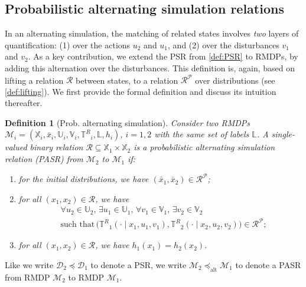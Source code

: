 \documentclass[letterpaper, 10 pt, conference]{ieeeconf}  %
\newtheorem{definition}{Definition}
\newcommand*{\States}{\ensuremath{\mathbb{X}}}
\newcommand*{\Actions}{\ensuremath{\mathbb{U}}}
\newcommand*{\Disturb}{\ensuremath{\mathbb{V}}}
\newcommand*{\Labels}{\ensuremath{\mathbb{L}}}
\newcommand*{\initState}{\ensuremath{\bar{x}}}
\newcommand*{\transfuncR}{\ensuremath{\mathbb{T}^R}}
\newcommand*{\labelfunc}{\ensuremath{h}}
\newcommand*{\mdp}{\ensuremath{\mathcal{D}}}
\newcommand*{\rmdp}{{\ensuremath{\mathcal{M}}}}
\newcommand*{\RMDPi}[1]{\ensuremath{\tuple{\States_{#1},{\initState}_{#1},\Actions_{#1},\Disturb_{#1},\transfuncR_{#1},\Labels,\labelfunc_{#1}}}}
\newcommand*{\tuple}[1]{\left(#1\right)}
\newcommand*{\Relation}{\mathcal{R}}
\newcommand*{\liftRelation}{\mathcal{R}^\mathcal{P}}
\begin{document}
\subsection{Probabilistic alternating simulation relations}
In an alternating simulation, the matching of related states involves \emph{two} layers of quantification: (1) over the actions $u_2$ and $u_1$, and (2) over the disturbances $v_1$ and $v_2$.
As a key contribution, we extend the PSR from \cref{def:PSR} to RMDPs, by adding this alternation over the disturbances.
This definition is, again, based on lifting a relation $\Relation$ between states, to a relation $\liftRelation$ over distributions (see \cref{def:lifting}).
We first provide the formal definition and discuss its intuition thereafter.

\begin{definition}[Prob. alternating simulation]
    \label{def:PASR}
    Consider two RMDPs $\rmdp_i = \RMDPi{i}$, $i=1,2$ with the same set of labels $\Labels$.
    A single-valued binary relation $\Relation \subseteq \States_1 \times \States_2$ is a \emph{probabilistic alternating simulation relation (PASR)} from $\rmdp_2$ to $\rmdp_1$ if:
    \begin{enumerate}
        \item %
        for the initial distributions, we have $(\initState_1, \initState_2) \in \liftRelation$;
        \item %
        for all $(x_1, x_2) \in \Relation$, we have
        \begin{align}
            &\forall u_2 \in \Actions_2, \, \exists u_1 \in \Actions_1, \, \forall v_1 \in \Disturb_1, \, \exists v_2 \in \Disturb_2
            \label{eq:PASR_next}
            \\
            &\!\!\!\!\!\text{such that}\,\big( \transfuncR_1(\cdot \mid x_1, u_1, v_1), \transfuncR_2(\cdot \mid x_2, u_2, v_2) \big) \in \liftRelation;
            \nonumber
        \end{align}
        \item %
        for all $(x_1, x_2) \in \Relation$, we have $\labelfunc_1(x_1) = \labelfunc_2(x_2)$.
    \end{enumerate}
\end{definition}

Like we write $\mdp_2 \preceq \mdp_1$ to denote a PSR, we write $\rmdp_2 \preceq_\text{alt} \rmdp_1$ to denote a PASR from RMDP $\rmdp_2$ to RMDP $\rmdp_1$.
\end{document}
